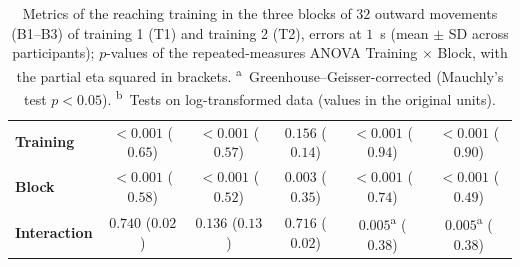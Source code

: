 \begin{table}[tbp]
{\begin{tabular}{lccccc}
        \textbf{\boldmath Training} & ${<}0.001$ ($0.65$) & ${<}0.001$ ($0.57$) & $0.156$ ($0.14$) & ${<}0.001$ ($0.94$) & ${<}0.001$ ($0.90$) \\
        \textbf{\boldmath Block} & ${<}0.001$ ($0.58$) & ${<}0.001$ ($0.52$) & $0.003$ ($0.35$) & ${<}0.001$ ($0.74$) & ${<}0.001$ ($0.49$) \\
        \textbf{\boldmath Interaction} & $0.740$ ($0.02$) & $0.136$ ($0.13$) & $0.716$ ($0.02$) & $0.005$\textsuperscript{a} ($0.38$) & $0.005$\textsuperscript{a} ($0.38$) \\
        \bottomrule
    \end{tabular}}
    \caption[Reaching training: results]{Metrics of the reaching training in the three blocks of $32$ outward movements (B1--B3) of training 1 (T1) and training 2 (T2), errors at $1$~s (mean $\pm$ SD across participants); $p$-values of the repeated-measures ANOVA Training $\times$ Block, with the partial eta squared in brackets. \textsuperscript{a}~Greenhouse--Geisser-corrected (Mauchly's test $p < 0.05$). \textsuperscript{b}~Tests on log-transformed data (values in the original units).}
    \label{tab:results_training}
\end{table}
